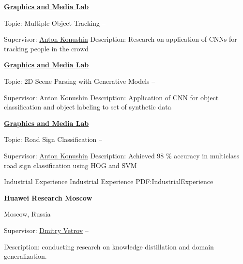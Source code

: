 \documentclass[letterpaper,MMMyyyy,nonstopmode]{simpleresumecv}
\begin{document}
\begin{Body}
\Entry
\href{https://graphics.cs.msu.ru}
{\textbf{Graphics and Media Lab}}

\Gap
\BulletItem
Topic: Multiple Object Tracking
\hfill
{} --
\begin{Detail}
\SubBulletItem
Supervisor:
\href{https://www.hse.ru/en/staff/akonushin}{Anton Konushin}
\SubBulletItem
Description:
Research on application of CNNs for tracking people in the crowd
\end{Detail}

\Gap

\Entry
\href{https://graphics.cs.msu.ru}
{\textbf{Graphics and Media Lab}}

\Gap
\BulletItem
Topic: 2D Scene Parsing with Generative Models
\hfill
{} --
\begin{Detail}
\SubBulletItem
Supervisor:
\href{https://www.hse.ru/en/staff/akonushin}{Anton Konushin}
\SubBulletItem
Description:
Application of CNN for object classification and object labeling to \newline
set of synthetic data
\end{Detail}

\Gap

\Entry
\href{https://graphics.cs.msu.ru}
{\textbf{Graphics and Media Lab}}

\Gap
\BulletItem
Topic: Road Sign Classification
\hfill
{} --
\begin{Detail}
\SubBulletItem
Supervisor:
\href{https://www.hse.ru/en/staff/akonushin}{Anton Konushin}
\SubBulletItem
Description:
Achieved 98 \% accuracy in multiclass road sign classification \newline
using HOG and SVM
\end{Detail}



\Section
{Industrial Experience}
{Industrial Experience}
{PDF:IndustrialExperience}

\Entry
\textbf{Huawei Research Moscow}
\par
Moscow, Russia

\Gap
\BulletItem
Supervisor: \href{https://bayesgroup.ru/people/dmitry-vetrov/}{Dmitry Vetrov}
\hfill
{} --
\begin{Detail}
\SubBulletItem
Description: conducting research on knowledge distillation and domain generalization.
\end{Detail}


\end{Body}
\end{document}
